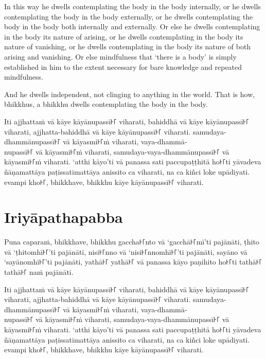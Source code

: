In this way he dwells contemplating the body in the body internally, or he
dwells contemplating the body in the body externally, or he dwells contemplating
the body in the body both internally and externally. Or else he dwells
contemplating in the body its nature of arising, or he dwells contemplating in
the body its nature of vanishing, or he dwells contemplating in the body its
nature of both arising and vanishing. Or else mindfulness that ‘there is a body’
is simply established in him to the extent necessary for bare knowledge and
repeated mindfulness.

And he dwells independent, not clinging to anything in the world. That is how,
bhikkhus, a bhikkhu dwells contemplating the body in the body.


\paliPage

Iti ajjhattaṁ vā kāye kāyānupassī꜔꜒ viharati, bahiddhā vā kāye kāyānupassī꜔꜒
viharati, ajjhatta-bahiddhā vā kāye kāyānupassī꜔꜒ viharati. samudaya-dhammānupassī꜔꜒
vā kāyasmi꜔꜒ṁ viharati, vaya-dhammā-\\
nupassī꜔꜒ vā kāyasmi꜔꜒ṁ viharati, samudaya-vaya-dhammānupassī꜔꜒ vā kāyasmi꜔꜒ṁ viharati.
‘atthi kāyo’ti vā panassa sati paccupaṭṭhitā ho꜔꜒ti yāvadeva ñāṇamattāya
paṭissatimattāya anissito ca viharati, na ca kiñci loke upādiyati. evampi kho꜔꜒,
bhikkhave, bhikkhu kāye kāyānupassī꜔꜒ viharati.


\section*{Iriyāpathapabba}

Puna caparaṁ, bhikkhave, bhikkhu gaccha꜔꜒nto vā ‘gacchā꜔꜒mī’ti pajānāti, ṭhito vā
‘ṭhitomhī꜔꜒’ti pajānāti, nisi꜔꜒nno vā ‘nisi꜔꜒nnomhī꜔꜒’ti pajānāti, sayāno vā
‘sayānomhī꜔꜒’ti pajānāti, yathā꜔꜒ yathā꜔꜒ vā panassa kāyo paṇihito ho꜔꜒ti tathā꜔꜒ tathā꜔꜒
naṁ pajānāti.

Iti ajjhattaṁ vā kāye kāyānupassī꜔꜒ viharati, bahiddhā vā kāye kāyānupassī꜔꜒
viharati, ajjhatta-bahiddhā vā kāye kāyānupassī꜔꜒ viharati. samudaya-dhammānupassī꜔꜒
vā kāyasmi꜔꜒ṁ viharati, vaya-dhammā-\\
nupassī꜔꜒ vā kāyasmi꜔꜒ṁ viharati, samudaya-vaya-dhammānupassī꜔꜒ vā kāyasmi꜔꜒ṁ viharati.
‘atthi kāyo’ti vā panassa sati paccupaṭṭhitā ho꜔꜒ti yāvadeva ñāṇamattāya
paṭissatimattāya anissito ca viharati, na ca kiñci loke upādiyati. evampi kho꜔꜒,
bhikkhave, bhikkhu kāye kāyānupassī꜔꜒ viharati.

